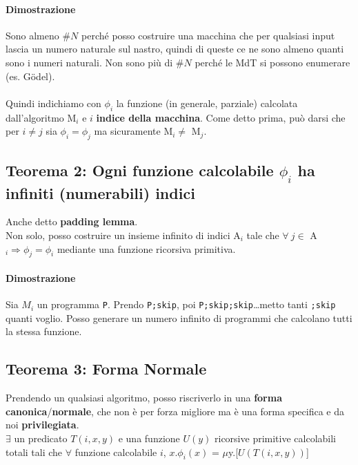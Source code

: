 \documentclass[10pt]{book}
\begin{document}
\paragraph{Dimostrazione} Sono almeno \#$N$ perché posso costruire una macchina che per qualsiasi input lascia un numero naturale sul nastro, quindi di queste ce ne sono almeno quanti sono i numeri naturali. Non sono più di \#$N$ perché le MdT si possono enumerare (es. G\"{o}del).\\\\
Quindi indichiamo con $\phi_i$ la funzione (in generale, parziale) calcolata dall'algoritmo M$_i$ e $i$ \textbf{indice della macchina}. Come detto prima, può darsi che per $i \neq j$ sia $\phi_i = \phi_j$ ma sicuramente M$_i \neq$ M$_j$.
\subsection{Teorema 2: Ogni funzione calcolabile $\phi_i$ ha infiniti (numerabili) indici}
Anche detto \textbf{padding lemma}.\\
Non solo, posso costruire un insieme infinito di indici A$_i$ tale che $\forall\:j \in$ A$_i \Rightarrow \phi_j = \phi_i$ mediante una funzione ricorsiva primitiva.
\paragraph{Dimostrazione} Sia $M_i$ un programma \texttt{P}. Prendo \texttt{P;skip}, poi \texttt{P;skip;skip}\ldots metto tanti \texttt{;skip} quanti voglio. Posso generare un numero infinito di programmi che calcolano tutti la stessa funzione.
\subsection{Teorema 3: Forma Normale}
Prendendo un qualsiasi algoritmo, posso riscriverlo in una \textbf{forma canonica}/\textbf{normale}, che non è per forza migliore ma è una forma specifica e da noi \textbf{privilegiata}.\\
$\exists$ un predicato $T(i, x, y)$ e una funzione $U(y)$ ricorsive primitive calcolabili totali tali che $\forall$ funzione calcolabile $i$, $x$.$\phi_i(x)$ = $\mu$y.[$U(T(i, x, y))$]
\end{document}
